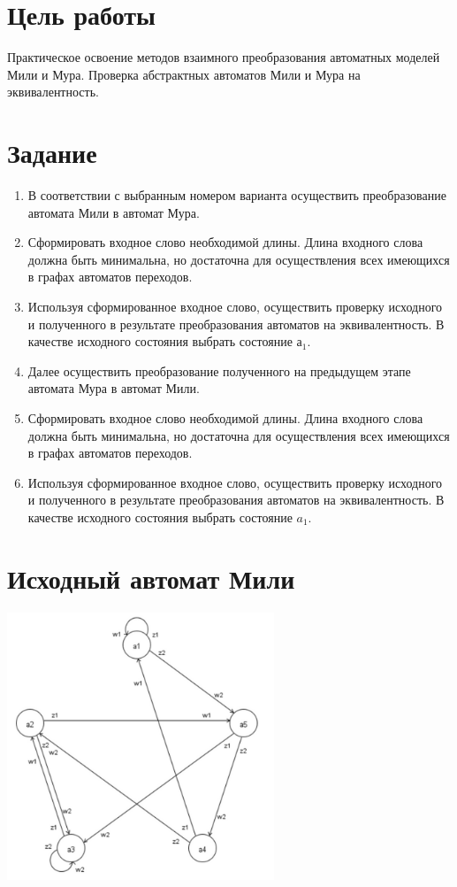 \documentclass[listings]{labreport}
\begin{document}
\maketitlepage

\section*{Цель работы}

Практическое освоение методов взаимного преобразования автоматных моделей Мили и Мура.
Проверка абстрактных автоматов Мили и Мура на эквивалентность.

\section*{Задание}

\begin{enumerate}
\item В соответствии с выбранным номером варианта осуществить преобразование автомата Мили в автомат Мура.
\item Сформировать входное слово необходимой длины. Длина входного слова должна быть минимальна,
  но достаточна для осуществления всех имеющихся в графах автоматов переходов.
\item Используя сформированное входное слово, осуществить проверку исходного и полученного в результате
  преобразования автоматов на эквивалентность. В качестве исходного состояния выбрать состояние $а_1$.
\item Далее осуществить преобразование полученного на предыдущем этапе автомата Мура в автомат Мили.
\item Сформировать входное слово необходимой длины. Длина входного слова должна быть минимальна,
  но достаточна для осуществления всех имеющихся в графах автоматов переходов.
\item Используя сформированное входное слово, осуществить проверку исходного и полученного в результате
  преобразования автоматов на эквивалентность. В качестве исходного состояния выбрать состояние $a_1$.
\end{enumerate}

\section*{Исходный автомат Мили}

\includegraphics[width=0.6\textwidth]{HW1.png}
\end{document}
